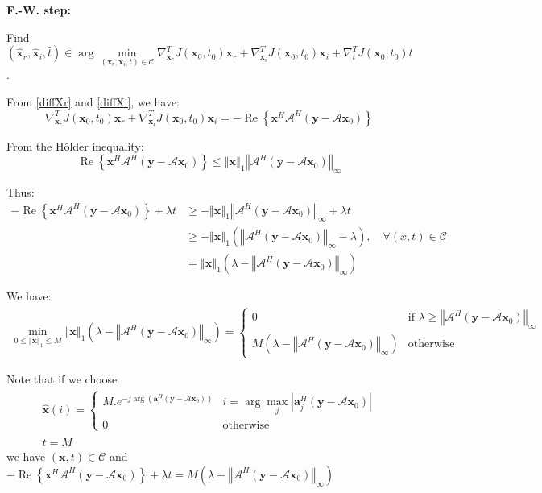 \documentclass{article}
\renewcommand{\vec}[1]{\ensuremath{\bm{#1}}}
\newcommand{\y}{\vec{y}}
\newcommand{\dico}{\ensuremath{\mathcal{A}}}
\newcommand{\atom}{\ensuremath{\vec{a}}}
\newcommand{\x}{\vec{x}}
\newcommand{\abs}[1]{\ensuremath{\left|#1\right|}}
\newcommand{\normUn}[1]{\ensuremath{\left\Vert#1\right\Vert_1}}
\newcommand{\normInf}[1]{\ensuremath{\left\Vert#1\right\Vert_\infty}}
\newcommand{\aml}[1]{\ensuremath{\arg\min\limits_{#1}}}
\newcommand{\aMl}[1]{\ensuremath{\arg\max\limits_{#1}}}
\renewcommand{\Re}{\operatorname{Re}}
\begin{document}
	\textbf{F.-W. step:} 
	
	Find $(\hat{\x}_r,\hat{\x}_i,\hat{t})\in\aml{(\x_r,\x_i,t)\in\mathcal{C}}\nabla_{\x_r}^TJ(\x_0,t_0)\x_r
	+\nabla_{\x_i}^TJ(\x_0,t_0)\x_i+\nabla_{t}^TJ(\x_0,t_0)t$.
	
	From \cref{diffXr} and \cref{diffXi}, we have:
	\begin{equation*}
		\nabla_{\x_r}^TJ(\x_0,t_0)\x_r
		+\nabla_{\x_i}^TJ(\x_0,t_0)\x_i = -\Re\left\{\x^H\dico^H(\y-\dico\x_0)\right\}
	\end{equation*}
	
	From the Hôlder inequality:
	\begin{equation*}
		\Re\left\{\x^H\dico^H(\y-\dico\x_0)\right\}\leq\normUn{\x}\normInf{\dico^H(\y-\dico\x_0)}
	\end{equation*}
	
	Thus:
	\begin{align*}
		-\Re\left\{\x^H\dico^H(\y-\dico\x_0)\right\}+\lambda t & \geq-\normUn{\x}\normInf{\dico^H(\y-\dico\x_0)}+\lambda t\\
		& \geq-\normUn{\x}\left(\normInf{\dico^H(\y-\dico\x_0)}-\lambda\right),\quad\forall (x,t)\in\mathcal{C}\\
		& = \normUn{\x}\left(\lambda-\normInf{\dico^H(\y-\dico\x_0)}\right)
	\end{align*}
	
	We have:
	\begin{align}
		\min\limits_{0\leq\normUn{\x}\leq M} \normUn{\x}\left(\lambda-\normInf{\dico^H(\y-\dico\x_0)}\right) = \left\{
		\begin{array}{ll}
			0 & \text{if } \lambda\geq\normInf{\dico^H(\y-\dico\x_0)}\\
			M\left(\lambda-\normInf{\dico^H(\y-\dico\x_0)}\right) & \text{otherwise}
		\end{array}\label{eq_bound}
		\right.
	\end{align}
	
	Note that if we choose
	\begin{equation}
		\begin{array}{ll}
			\hat{\x}(i) = \left\{\begin{array}{ll}
				M.e^{-j\arg(\atom_i^H(\y-\dico\x_0))} & i=\aMl{j}\abs{\atom_j^H(\y-\dico\x_0)}\\
				0 & \text{otherwise}
			\end{array}\right.\\
			\hat{t} = M
		\end{array}\label{eq_min}
	\end{equation}
	we have $(\x,t)\in\mathcal{C}$ and $-\Re\left\{\x^H\dico^H(\y-\dico\x_0)\right\}+\lambda t=M\left(\lambda-\normInf{\dico^H(\y-\dico\x_0)}\right)$
	
\end{document}
